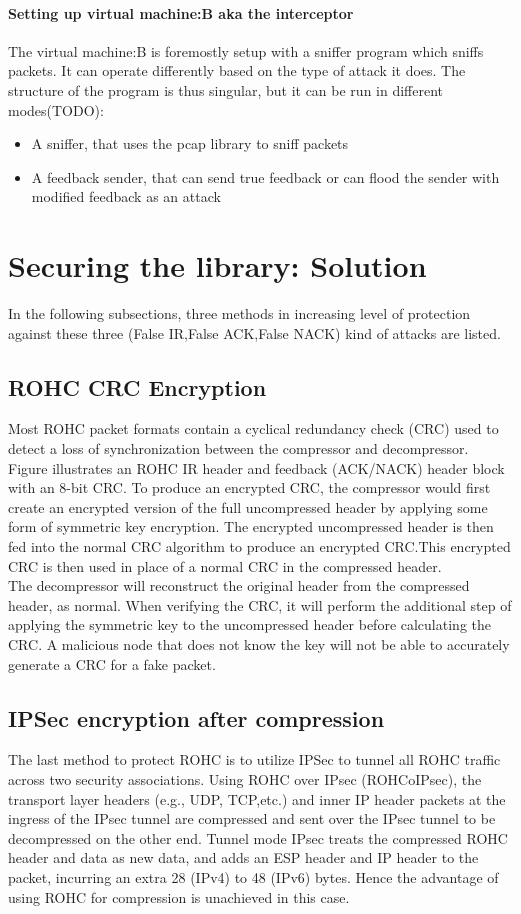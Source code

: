 \documentclass[a4paper,11pt]{article}
\begin{document}
\paragraph{Setting up virtual machine:B aka the interceptor}
The virtual machine:B is foremostly setup with a sniffer program which sniffs packets.
It can operate differently based on the type of attack it does. The structure of the program is thus singular, but it can be run 
in different modes(TODO):
\begin{itemize}
	\item A sniffer, that uses the pcap library to sniff packets 
	\item A feedback sender, that can send true feedback or can flood the sender with modified feedback as an attack
\end{itemize}




\pagebreak
\section{Securing the library: Solution}
In the following subsections, three methods in increasing level of protection against these three (False IR,False ACK,False NACK) kind of attacks are listed.
\subsection{ROHC CRC Encryption}
Most ROHC packet formats contain a cyclical redundancy check (CRC) used to detect a loss of synchronization between the compressor and decompressor. Figure  illustrates an ROHC IR header and feedback (ACK/NACK) header block with an 8-bit CRC. To produce an encrypted CRC, the compressor would first create an encrypted version of the full uncompressed header by applying some form of symmetric key encryption. The encrypted uncompressed header is then fed into the normal CRC algorithm to produce an encrypted CRC.This encrypted CRC is then used in place of a normal CRC in the compressed header.\\
The decompressor will reconstruct the original header from the compressed header, as normal. When verifying the CRC,
it will perform the additional step of applying the symmetric key to the uncompressed header before calculating the CRC.
A malicious node that does not know the key will not be able to accurately generate a CRC for a fake packet.
\subsection{IPSec encryption after compression}
The last method to protect ROHC is to utilize IPSec  to tunnel all ROHC traffic across two security associations. Using ROHC over IPsec (ROHCoIPsec), the transport layer headers (e.g., UDP, TCP,etc.) and inner IP header packets at the ingress of the IPsec tunnel are compressed and sent over the IPsec tunnel to be decompressed on the other end. Tunnel mode IPsec treats the compressed ROHC header and data as new data, and adds an ESP header and IP header to the packet, incurring an extra 28 (IPv4) to 48 (IPv6) bytes. Hence the advantage of using ROHC for compression is unachieved in this case.
\end{document}
